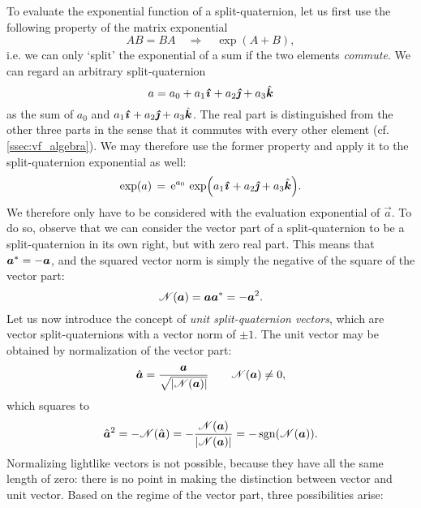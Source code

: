 To evaluate the exponential function of a split-quaternion, let us first use the following property of the matrix exponential \cite{Hall2013}
\begin{equation}
     AB = BA \quad \Rightarrow \quad \exp(A + B),
\end{equation}
i.e. we can only `split' the exponential of a sum if the two elements \emph{commute}. We can regard an arbitrary split-quaternion
\begin{equation}
     a = \quat{a_0}{a_1}{a_2}{a_3}
\end{equation}
as the sum of \(a_0\) and \(\quatvec{a_1}{a_2}{a_3}\). The real part is distinguished from the other three parts in the sense that it commutes
with every other element (cf. \cref{ssec:vf_algebra}). We may therefore use the former property and apply it to the split-quaternion exponential as well:
\begin{equation}
     \exp(a) \, = \,\ec^{a_0}\,\exp(\quatvec{a_1}{a_2}{a_3}).
\end{equation}
We therefore only have to be considered with the evaluation exponential of \(\vec{a}\). To do so, observe that we can consider the vector part of a split-quaternion to be a split-quaternion in its own right, but with zero real part. This means that \( \conj{\vec{a}} = -\vec{a} \), and the squared vector norm is simply the negative of the square of the vector part:
\begin{equation}
     \mathscr{N}(\vec{a}) = \vec{a} \conj{\vec{a}} = -\vec{a}^2.
\end{equation}
Let us now introduce the concept of \emph{unit split-quaternion vectors}, which are vector split-quaternions with a vector norm of \(\pm 1\). The unit vector may be obtained by normalization of the vector part:
\begin{equation}
     \hat{\vec{a}} = \frac{\vec{a}}{\sqrt{\abs{\mathscr{N}(\vec{a})}}} \qquad \mathscr{N}(\vec{a}) \neq 0,
\end{equation}
which squares to
\begin{equation}
     \hat{\vec{a}}^2 = - \mathscr{N}(\hat{\vec{a}}) 
                   = - \frac{\mathscr{N}(\vec{a})}{\abs{\mathscr{N}(\vec{a})}} 
                   = - \sgn(\mathscr{N}(\vec{a})).
\end{equation}
Normalizing lightlike vectors is not possible, because they have all the same length of zero: there is no point in making the distinction between vector and unit vector. Based on the regime of the vector part, three possibilities arise: \cite{Motter1998,Harkin2004}
